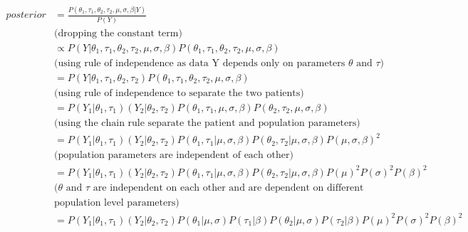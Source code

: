 \documentclass[12pt,a4paper,leqno]{report}
\theoremstyle{plain}
\theoremstyle{definition}
\theoremstyle{remark}
\begin{document}
\begin{equation*}\label{}
    \begin{aligned}\label{conjugatebayesrule}
        posterior &= \frac{P(\theta_1,\tau_1,\theta_2,\tau_2,\mu,\sigma,\beta| Y)}{P(Y)} \\
        &\text{(dropping the constant term)} \nonumber \\
        &\propto P(Y|\theta_1,\tau_1,\theta_2,\tau_2,\mu,\sigma,\beta)P(\theta_1,\tau_1,\theta_2,\tau_2,\mu,\sigma,\beta) \nonumber \\
        &\text{(using rule of independence as data Y depends only on parameters $\theta$ and $\tau$)} \nonumber \\
        &= P(Y|\theta_1,\tau_1, \theta_2, \tau_2)P(\theta_1,\tau_1,\theta_2,\tau_2,\mu,\sigma,\beta) \nonumber \\
        &\text{(using rule of independence to separate the two patients)} \nonumber \\
        &= P(Y_1|\theta_1,\tau_1)(Y_2|\theta_2, \tau_2)P(\theta_1,\tau_1, \mu,\sigma,\beta)P(\theta_2,\tau_2,\mu,\sigma,\beta) \nonumber \\
        &\text{(using the chain rule separate the patient and population parameters)} \nonumber \\
        &= P(Y_1|\theta_1,\tau_1)(Y_2|\theta_2, \tau_2)P(\theta_1,\tau_1|\mu,\sigma,\beta)P(\theta_2,\tau_2|\mu,\sigma,\beta)P(\mu,\sigma,\beta)^2 \nonumber \\
        &\text{(population parameters are independent of each other)} \nonumber \\
        &= P(Y_1|\theta_1,\tau_1)(Y_2|\theta_2, \tau_2)P(\theta_1,\tau_1|\mu,\sigma,\beta)P(\theta_2,\tau_2|\mu,\sigma,\beta)P(\mu)^2P(\sigma)^2P(\beta)^2 \nonumber \\
        &\text{($\theta$ and $\tau$ are independent on each other and are dependent on different} \nonumber \\
        & \text{population level parameters)} \nonumber \\
        &= P(Y_1|\theta_1,\tau_1)(Y_2|\theta_2, \tau_2)P(\theta_1|\mu,\sigma)P(\tau_1|\beta)P(\theta_2|\mu,\sigma)P(\tau_2|\beta)P(\mu)^2P(\sigma)^2P(\beta)^2 \nonumber
    \end{aligned}
\end{equation*}
\end{document}
